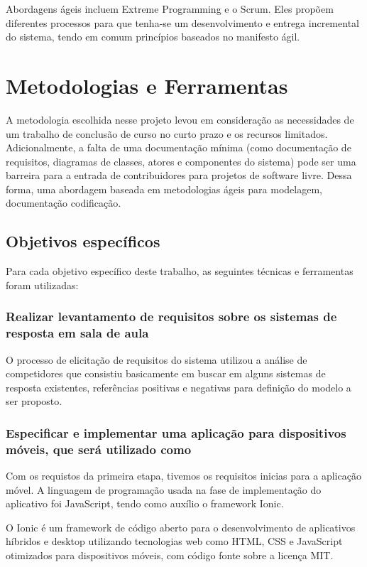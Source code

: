 Abordagens ágeis incluem Extreme Programming e o Scrum. Eles propõem diferentes processos
para que tenha-se um desenvolvimento e entrega incremental do sistema, tendo em comum princípios
baseados no manifesto ágil.


\section{Metodologias e Ferramentas}
A metodologia escolhida nesse projeto levou em consideração as necessidades de um trabalho de
conclusão de curso no curto prazo e os recursos limitados. Adicionalmente, a falta de uma documentação
mínima (como documentação de requisitos, diagramas de classes, atores e componentes do sistema)
pode ser uma barreira para a entrada de contribuidores para projetos de software livre. Dessa forma,
uma abordagem baseada em metodologias ágeis para modelagem, documentação codificação.

\subsection{Objetivos específicos}

Para cada objetivo específico deste trabalho, as seguintes técnicas e ferramentas foram utilizadas:

\subsubsection{Realizar levantamento de requisitos sobre os sistemas de resposta em sala de aula}

O processo de elicitação de requisitos do sistema utilizou a análise de competidores que
consistiu basicamente em buscar em alguns sistemas de resposta existentes, referências positivas e
negativas para definição do modelo a ser proposto.

\subsubsection{Especificar e implementar uma aplicação para dispositivos móveis, que será utilizado como {\clickers}}

Com os requistos da primeira etapa, tivemos os requisitos inicias para a aplicação móvel.
A linguagem de programação usada na fase de implementação do aplicativo foi JavaScript, tendo como auxílio o framework Ionic.

O Ionic é um framework de código aberto para o desenvolvimento de aplicativos híbridos e desktop utilizando
tecnologias web como HTML, CSS e JavaScript otimizados para dispositivos móveis, com código fonte sobre a licença MIT.

